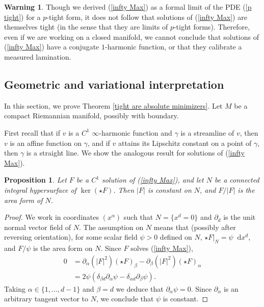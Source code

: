 \documentclass[reqno,11pt]{amsart}
\newcommand*\dif{\mathop{}\!\mathrm{d}}
\newtheorem{proposition}[theorem]{Proposition}
\theoremstyle{definition}
\newtheorem{warning}[theorem]{Warning}
\numberwithin{equation}{section}
\begin{document}
\begin{warning}
Though we derived (\ref{infty Max}) as a formal limit of the PDE (\ref{p tight}) for a $p$-tight form, it does not follow that solutions of (\ref{infty Max}) are themselves tight (in the sense that they are limits of $p$-tight forms).
Therefore, even if we are working on a closed manifold, we cannot conclude that solutions of (\ref{infty Max}) have a conjugate $1$-harmonic function, or that they calibrate a measured lamination.
\end{warning}

\subsection{Geometric and variational interpretation}\label{EL interpretation}
In this section, we prove Theorem \ref{tight are absolute minimizers}.
Let $M$ be a compact Riemannian manifold, possibly with boundary.

First recall that if $v$ is a $C^1$ $\infty$-harmonic function and $\gamma$ is a streamline of $v$, then $v$ is an affine function on $\gamma$, and if $v$ attains its Lipschitz constant on a point of $\gamma$, then $\gamma$ is a straight line.
We show the analogous result for solutions of (\ref{infty Max}).

\begin{proposition}
Let $F$ be a $C^1$ solution of (\ref{infty Max}), and let $N$ be a connected integral hypersurface of $\ker(\star F)$.
Then $|F|$ is constant on $N$, and $F/|F|$ is the area form of $N$.
\end{proposition}
\begin{proof}
We work in coordinates $(x^\alpha)$ such that $N = \{x^d = 0\}$ and $\partial_d$ is the unit normal vector field of $N$.
The assumption on $N$ means that (possibly after reversing orientation), for some scalar field $\psi > 0$ defined on $N$, $\star F|_N = \psi \dif x^d$, and $F/\psi$ is the area form on $N$.
Since $F$ solves (\ref{infty Max}),
\begin{align*}
0 
&= \partial_\alpha(|F|^2)(\star F)_\beta - \partial_\beta(|F|^2)(\star F)_\alpha \\
&= 2\psi(\delta_{\beta d} \partial_\alpha \psi - \delta_{\alpha d} \partial_\beta \psi).
\end{align*}
Taking $\alpha \in \{1, \dots, d - 1\}$ and $\beta = d$ we deduce that $\partial_\alpha \psi = 0$.
Since $\partial_\alpha$ is an arbitrary tangent vector to $N$, we conclude that $\psi$ is constant.
\end{proof}
\end{document}
